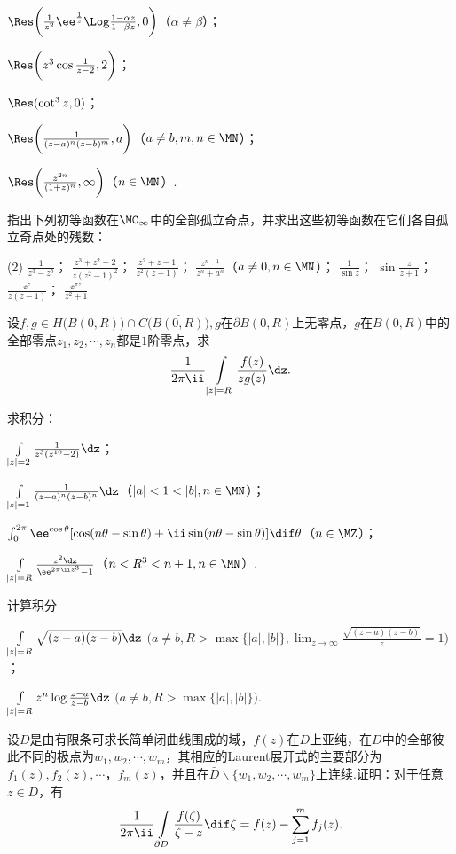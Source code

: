 \begin{xiti}
\begin{enuma}
  \item $\Res\bigg(\frac1{z^2}\ee^{\frac1z}\Log\frac{1-\alpha z}{1-\beta z},0\bigg)
  $（$\alpha\ne\beta$）；
  \item $\Res\bigg(z^3\cos\frac1{z-2},2\bigg)$；
  \item $\Res(\cot^3z,0)$；
  \item $\Res\bigg(\frac1{(z-a)^n(z-b)^m},a\bigg)$（$a\ne b,m,n\in\MN$）；
  \item $\Res\bigg(\frac{z^{2n}}{(1+z)^n},\infty\bigg)$（$n\in\MN$）.
\end{enuma}
\item 指出下列初等函数在$\MC_\infty$中的全部孤立奇点，并求出这些初等函数在它们各自孤立奇点处的残数：
\begin{tasks}(2)
\task $\frac1{z^3-z^5}$；
\task $\frac{z^3+z^2+2}{z(z^2-1)^2}$；
\task $\frac{z^2+z-1}{z^2(z-1)}$；
\task $\frac{z^{n-1}}{z^n+a^n}$（$a\ne0,n\in\MN$）；
\task $\frac1{\sin z}$；
\task $\sin\frac z{z+1}$；
\task $\frac{\ee^z}{z(z-1)}$；
\task $\frac{\ee^{\pi z}}{z^2+1}$.
\end{tasks}
\item 设$f,g\in H\big(B(0,R)\big)\cap C\big(\bar{B(0,R)}\big),g$在$\partial B(0,R)$上无零点，$g$在$B(0,R)$中的全部零点$z_1,z_2,\cdots,z_n$都是$1$阶零点，求
    \[\frac1{2\pi\ii}\int\limits_{|z|=R}\frac{f(z)}{zg(z)}\dz.\]
\item 求积分：
\begin{enuma}
  \item $\int\limits_{|z|=2}\frac1{z^3(z^{10}-2)}\dz$；
  \item $\int\limits_{|z|=1}\frac1{(z-a)^n(z-b)^n}\dz$（$|a|<1<|b|,n\in\MN$）；
  \item $\int_0^{2\pi}\ee^{\cos\theta}[\cos(n\theta-\sin\theta)+\ii
  \sin(n\theta-\sin\theta)]\dif \theta$（$n\in\MZ$）；
  \item $\int\limits_{|z|=R}\frac{z^2\dz}{\ee^{2\pi\ii z^3}-1}$（$n<R^3<n+1,n\in\MN$）.
\end{enuma}
\item 计算积分
\begin{enuma}
  \item $\int\limits_{|z|=R}\sqrt{(z-a)(z-b)}\dz$ $\bigg(a\ne b,R>\max\{|a|,|b|\},
  \lim_{z\to\infty}\frac{\sqrt{(z-a)(z-b)}}z=1\bigg)$；
  \item $\int\limits_{|z|=R}z^n\log\frac{z-a}{z-b}\dz$ $\big(a\ne b,R>\max\{|a|,|b|\}\big)$.
\end{enuma}
\item 设$D$是由有限条可求长简单闭曲线围成的域，$f(z)$在$D$上亚纯，在$D$中的全部彼此不同的极点为$w_1,w_2,\cdots,w_m$，其相应的Laurent展开式的主要部分为$f_1(z),f_2(z),\cdots$，$f_m(z)$，并且在$\bar D\backslash\{w_1,w_2,\cdots,w_m\}$上连续.证明：对于任意$z\in D$，有
    \[\frac1{2\pi\ii}\int\limits_{\partial D}\frac{f(\zeta)}{\zeta-z}\dif \zeta=f(z)-\sum_{j=1}^mf_j(z).\]
\end{xiti}

